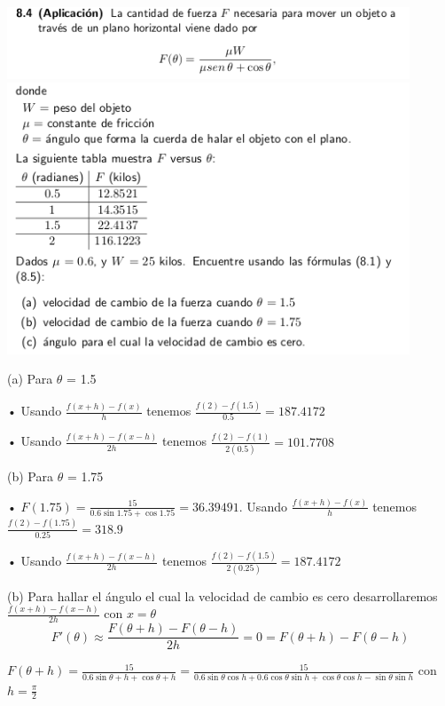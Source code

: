 \documentclass[11pt]{article}
\begin{document}
\vspace{0.5cm}
\begin{center}
    \includegraphics[keepaspectratio, width=12cm]{8.41.png}
    \includegraphics[keepaspectratio, width=12cm]{8.42.png}
\end{center} 

\vspace{0.25cm}
(a) Para $\theta$ = 1.5 

• Usando $\frac{f(x + h) - f(x)}{h}$ tenemos $\frac{f(2) - f(1.5)}{0.5} = 187.4172$

• Usando $\frac{f(x + h) − f(x - h)}{2h}$ tenemos $\frac{f(2) − f(1)}{2(0.5)} = 101.7708$

(b) Para $\theta$ = 1.75 

• $F(1.75) = \frac{15}{0.6\sin1.75+\cos1.75} = 36.39491$. Usando $\frac{f(x + h) - f(x)}{h}$ tenemos $\frac{f(2) - f(1.75)}{0.25} = 318.9$

• Usando $\frac{f(x + h) − f(x - h)}{2h}$ tenemos $\frac{f(2) − f(1.5)}{2(0.25)} = 187.4172$

(b) Para hallar el ángulo el cual la velocidad de cambio es cero desarrollaremos $\frac{f(x + h) − f(x - h)}{2h}$ con $x = \theta$
\begin{equation}
 F'(\theta) \approx	\frac{F(\theta+h)-F(\theta-h)}{2h} = 0 = F(\theta+h)-F(\theta-h)
\end{equation}

$F(\theta+h) = \frac{15}{0.6\sin{\theta+h}+\cos{\theta+h}} = \frac{15}{0.6\sin{\theta}\cos{h}+0.6\cos{\theta}\sin{h}+\cos{\theta}\cos{h}-\sin{\theta}\sin{h}} $
con $h = \frac{\pi}{2}$ 
\end{document}
